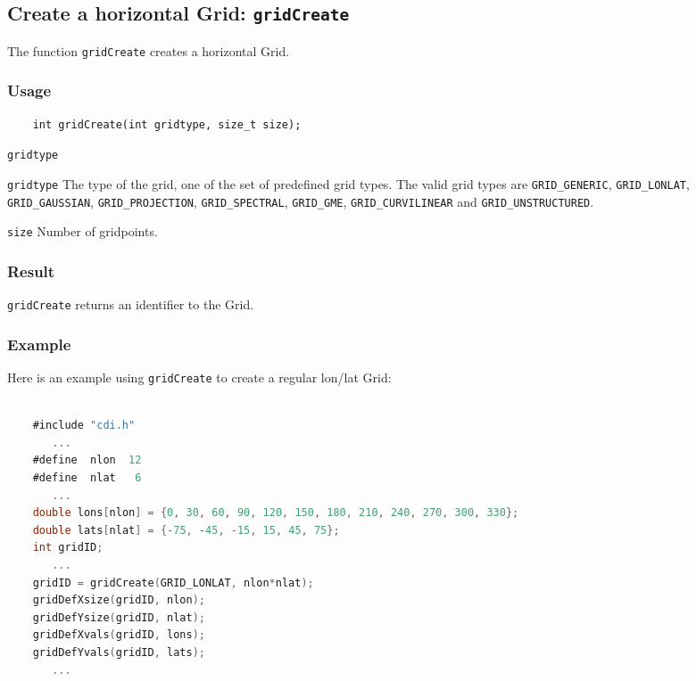 

\subsection{Create a horizontal Grid: \texttt{gridCreate}}
\label{gridCreate}

The function {\texttt{gridCreate}} creates a horizontal Grid.

\subsubsection*{Usage}

\begin{verbatim}
    int gridCreate(int gridtype, size_t size);
\end{verbatim}

\hspace*{4mm}\begin{minipage}[]{15cm}
\begin{deflist}{\texttt{gridtype}\ }
\item[\texttt{gridtype}]
The type of the grid, one of the set of predefined {\CDI} grid types.
                     The valid {\CDI} grid types are {\texttt{GRID\_GENERIC}}, {\texttt{GRID\_LONLAT}},
                     {\texttt{GRID\_GAUSSIAN}}, {\texttt{GRID\_PROJECTION}}, {\texttt{GRID\_SPECTRAL}},
                     {\texttt{GRID\_GME}}, {\texttt{GRID\_CURVILINEAR}} and {\texttt{GRID\_UNSTRUCTURED}}.
\item[\texttt{size}]
Number of gridpoints.

\end{deflist}
\end{minipage}

\subsubsection*{Result}

{\texttt{gridCreate}} returns an identifier to the Grid.


\subsubsection*{Example}

Here is an example using {\texttt{gridCreate}} to create a regular lon/lat Grid:

\begin{lstlisting}[language=C, backgroundcolor=\color{pyellow}, basicstyle=\small, columns=flexible]

    #include "cdi.h"
       ...
    #define  nlon  12
    #define  nlat   6
       ...
    double lons[nlon] = {0, 30, 60, 90, 120, 150, 180, 210, 240, 270, 300, 330};
    double lats[nlat] = {-75, -45, -15, 15, 45, 75};
    int gridID;
       ...
    gridID = gridCreate(GRID_LONLAT, nlon*nlat);
    gridDefXsize(gridID, nlon);
    gridDefYsize(gridID, nlat);
    gridDefXvals(gridID, lons);
    gridDefYvals(gridID, lats);
       ...
\end{lstlisting}


